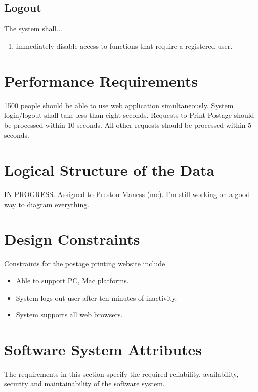 \documentclass{scrreprt}
\begin{document}
\subsection{Logout}

The system shall...

\begin{enumerate}
\item immediately disable access to functions that require a registered user.
\end{enumerate}

\section{Performance Requirements}

1500 people should be able to use web application simultaneously. System
login/logout shall take less than eight seconds. Requests to Print Postage
should be processed within 10 seconds. All other requests should be processed
within 5 seconds.

\section{Logical Structure of the Data}

IN-PROGRESS. Assigned to Preston Maness (me). I'm still working on a good 
way to diagram everything.

\section{Design Constraints}

Constraints for the postage printing website include

\begin{itemize}
\item Able to support PC, Mac platforms.
\item System logs out user after ten minutes of inactivity.
\item System supports all web browsers.
\end{itemize}

\section{Software System Attributes}

The requirements in this section specify the required reliability,
availability, security and maintainability of the software system.
\end{document}

